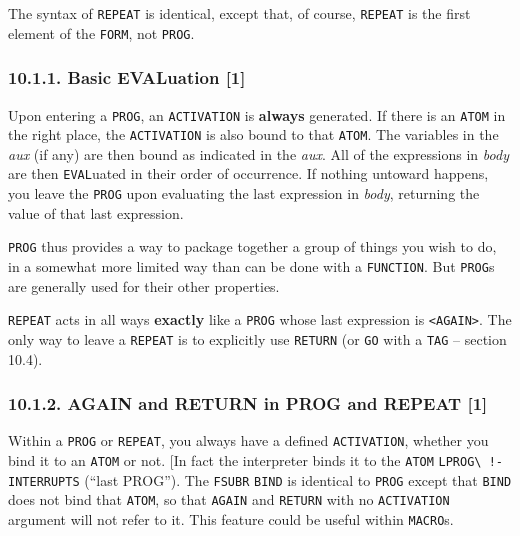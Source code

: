 \documentclass[a4paper,]{article}
\begin{document}
The syntax of \texttt{REPEAT} is identical, except that, of course, \texttt{REPEAT} is the first element of the
\texttt{FORM}, not \texttt{PROG}.

\subsubsection{10.1.1. Basic EVALuation {[}1{]}}\label{basic-evaluation-1}

Upon entering a \texttt{PROG}, an \texttt{ACTIVATION} is \textbf{always} generated. If there is an \texttt{ATOM} in the
right place, the \texttt{ACTIVATION} is also bound to that \texttt{ATOM}. The variables in the \emph{aux} (if any) are then
bound as indicated in the \emph{aux}. All of the expressions in \emph{body} are then \texttt{EVAL}uated in their order of
occurrence. If nothing untoward happens, you leave the \texttt{PROG} upon evaluating the last expression in \emph{body},
returning the value of that last expression.

\texttt{PROG} thus provides a way to package together a group of things you wish to do, in a somewhat more limited way than
can be done with a \texttt{FUNCTION}. But \texttt{PROG}s are generally used for their other properties.

\texttt{REPEAT} acts in all ways \textbf{exactly} like a \texttt{PROG} whose last expression is
\texttt{\textless{}AGAIN\textgreater{}}. The only way to leave a \texttt{REPEAT} is to explicitly use \texttt{RETURN} (or
\texttt{GO} with a \texttt{TAG} -- section 10.4).

\subsubsection{10.1.2. AGAIN and RETURN in PROG and REPEAT {[}1{]}}\label{again-and-return-in-prog-and-repeat-1}

Within a \texttt{PROG} or \texttt{REPEAT}, you always have a defined \texttt{ACTIVATION}, whether you bind it to an
\texttt{ATOM} or not. {[}In fact the interpreter binds it to the \texttt{ATOM} \texttt{LPROG\textbackslash{}\ !-INTERRUPTS}
 (``last PROG''). The \texttt{FSUBR}  \texttt{BIND}
 is identical to \texttt{PROG} except that \texttt{BIND} does not bind that \texttt{ATOM}, so
that \texttt{AGAIN}  and \texttt{RETURN}  with no
\texttt{ACTIVATION} argument will not refer to it. This feature could be useful within \texttt{MACRO}s.
\index{\texttt{MACRO}}{]}
\end{document}
